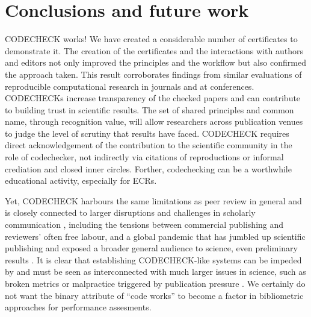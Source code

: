 \documentclass[12pt]{article}
\begin{document}
\section*{Conclusions and future work}\label{future-work-and-conclusions}

CODECHECK works!
We have created a considerable number of certificates to demonstrate it.
The creation of the certificates and the interactions with authors and
editors not only improved the principles and the workflow but also
confirmed the approach taken. This result corroborates findings from
similar evaluations of reproducible computational research in journals and
at conferences.
CODECHECKs increase transparency of the checked papers and can contribute
to building trust in scientific results.
The set of 
shared principles and common name, through recognition value,
will allow researchers
across publication venues to judge the level of scrutiny that results have
faced. CODECHECK requires direct acknowledgement of the contribution to the
scientific community in the role of codechecker, not indirectly via citations 
of reproductions or informal crediation and closed inner circles.
Forther, codechecking can be a worthwhile educational activity, especially for
ECRs.

Yet, CODECHECK harbours the same limitations as peer review
in general and is closely connected to larger disruptions and challenges
in scholarly communication
\cite{eglen_recent_2018,tennant_ten_2019,fyfe_mission_2019}, 
including the tensions between commercial publishing and reviewers' often
free labour, and a global pandemic that has jumbled up scientific publishing
and exposed a broader general audience to science, even preliminary 
results \cite{munafo_what_2020}.
It is clear that establishing CODECHECK-like systems can be 
impeded by and must be seen as interconnected with much larger issues in 
science, such as broken metrics or malpractice triggered by publication
pressure \cite{piwowar_altmetrics:_2013,nosek_promoting_2015}.
We certainly do not want the binary attribute of ``code works''
to become a factor in bibliometric approaches for performance assesments.
\end{document}
